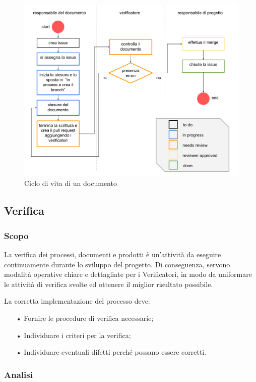 \begin{figure}[H]
\centering
\includegraphics[width=17cm]{img/document_lc.pdf}
\caption{Ciclo di vita di un documento}
\label{fig:document_lifecycle}
\end{figure}

\subsection{Verifica}

\subsubsection{Scopo}

La verifica dei processi, documenti e prodotti è un'attività da eseguire continuamente durante lo sviluppo del progetto. Di conseguenza, servono modalità operative chiare e dettagliate per i Verificatori, in modo da uniformare le attività di verifica svolte ed ottenere il miglior risultato possibile. 

La corretta implementazione del processo deve:
\begin{itemize}
\item[•] Fornire le procedure di verifica necessarie; 
\item[•] Individuare i criteri per la verifica; 
\item[•] Individuare eventuali difetti perché possano essere corretti.
\end{itemize}

\subsubsection{Analisi}


